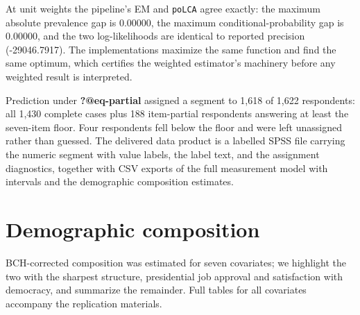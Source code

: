 \documentclass[
  12pt]{article}
\begin{document}
At unit weights the pipeline's EM and \texttt{poLCA} agree exactly: the
maximum absolute prevalence gap is 0.00000, the maximum
conditional-probability gap is 0.00000, and the two log-likelihoods are
identical to reported precision (-29046.7917). The implementations
maximize the same function and find the same optimum, which certifies
the weighted estimator's machinery before any weighted result is
interpreted.

Prediction under \textbf{?@eq-partial} assigned a segment to 1,618 of
1,622 respondents: all 1,430 complete cases plus 188 item-partial
respondents answering at least the seven-item floor. Four respondents
fell below the floor and were left unassigned rather than guessed. The
delivered data product is a labelled SPSS file carrying the numeric
segment with value labels, the label text, and the assignment
diagnostics, together with CSV exports of the full measurement model
with intervals and the demographic composition estimates.

\section{Demographic composition}\label{sec-results-demographics}

BCH-corrected composition was estimated for seven covariates; we
highlight the two with the sharpest structure, presidential job approval
and satisfaction with democracy, and summarize the remainder. Full
tables for all covariates accompany the replication materials.
\end{document}
